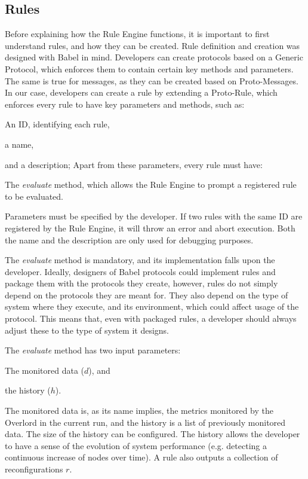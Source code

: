 \subsection{Rules}
Before explaining how the Rule Engine functions, it is important to first understand rules, and how they can be created. Rule definition and creation was designed with Babel in mind. Developers can create protocols based on a Generic Protocol, which enforces them to contain certain key methods and parameters. The same is true for messages, as they can be created based on Proto-Messages. In our case, developers can create a rule by extending a Proto-Rule, which enforces every rule to have key parameters and methods, such as: 
\begin{inparaenum}[(1)]
	\item An ID, identifying each rule,
	\item a name,
	\item and a description;
	Apart from these parameters, every rule must have:
	\item The \textit{evaluate} method, which allows the Rule Engine to prompt a registered rule to be evaluated.
\end{inparaenum}

Parameters must be specified by the developer. If two rules with the same ID are registered by the Rule Engine, it will throw an error and abort execution. Both the name and the description are only used for debugging purposes.

The \textit{evaluate} method is mandatory, and its implementation falls upon the developer. Ideally, designers of Babel protocols could implement rules and package them with the protocols they create, however, rules do not simply depend on the protocols they are meant for. They also depend on the type of system where they execute, and its environment, which could affect usage of the protocol. This means that, even with packaged rules, a developer should always adjust these to the type of system it designs.

The \textit{evaluate} method has two input parameters:
\begin{inparaenum}[(1)]
	\item The monitored data ($d$), and
	\item the history ($h$).
\end{inparaenum}
The monitored data is, as its name implies, the metrics monitored by the Overlord in the current run, and the history is a list of previously monitored data. The size of the history can be configured. The history allows the developer to have a sense of the evolution of system performance (e.g. detecting a continuous increase of nodes over time). A rule also outputs a collection of reconfigurations $r$.

